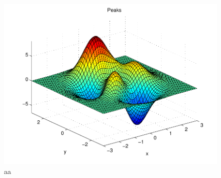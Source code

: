 \begin{figure}[h]
\small
\centering
\includegraphics[width=12cm]{mcmthesis-aaa-eps-converted-to.pdf}
\caption{aa} 
\label{fig:aa}
\end{figure}